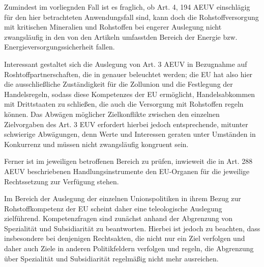 \documentclass[12pt,a4paper,oneside]{book} %
\begin{document}
Zumindest im vorliegnden Fall ist es fraglich, ob Art. 4, 194 AEUV einschlägig für den hier betrachteten Anwendungsfall sind, kann doch die Rohstoffversorgung mit kritischen Mineralien und Rohstoffen bei engerer Auslegung nicht zwangsläufig in den von den Artikeln umfasstden Bereich der Energie bzw. Energieversorgungssicherheit fallen.
	
Interessant gestaltet sich die Auslegung von Art. 3 AEUV in Bezugnahme auf Roshtoffpartnerschaften, die in %
 genauer beleuchtet werden; die EU hat also hier die ausschließliche Zuständigkeit für die Zollunion und die Festlegung der Handelsregeln, sodass diese Kompetenzes der EU ermöglicht, Handelsabkommen mit Drittstaaten zu schließen, die auch die Versorgung mit Rohstoffen regeln können. Das Abwägen möglicher Zielkonflikte zwischen den einzelnen Zielvorgaben des Art. 3 EUV erfordert hierbei jedoch entsprechende, mitunter schwierige Abwägungen, denn Werte und Interessen geraten unter Umständen in Konkurrenz und müssen nicht zwangsläufig kongruent sein.\autocite{Müller-Ibold/Herrmann, EuZW 2022, 1029, 1030} 
	
Ferner ist im jeweiligen betroffenen Bereich zu prüfen, inwieweit die in Art. 288 AEUV beschriebenen Handlungsinstrumente den EU-Organen für die jeweilige Rechtssetzung zur Verfügung stehen.  
	
Im Bereich der Auslegung der einzelnen Unionspolitiken in ihrem Bezug zur Rohstoffkompetenz der EU scheint daher eine teleologische Auslegung zielführend. Kompetenzfragen sind zunächst anhand der Abgrenzung von Spezialität und Subsidiarität zu beantworten.\autocite{Callies, Berliner Beiträge 137, S. 39f.} Hierbei ist jedoch zu beachten, dass insbesondere bei denjenigen Rechtsakten, die nicht nur ein Ziel verfolgen und daher auch Ziele in anderen Politikfeldern verfolgen und regeln, die Abgrenzung über Spezialität und Subsidiarität regelmäßig nicht mehr ausreichen.\autocite{CITATIONNEEDED}
	
\end{document}
